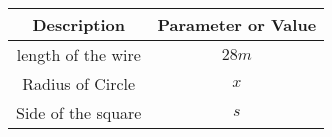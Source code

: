 \begin{tabular}{|c|c|}
    \hline
    \textbf{Description} & \textbf{Parameter or Value} \\
    \hline
    length of the wire & $28m$\\
    \hline
    Radius of Circle & $x$\\
    \hline 
    Side of the square & $s$\\
    \hline
\end{tabular}
